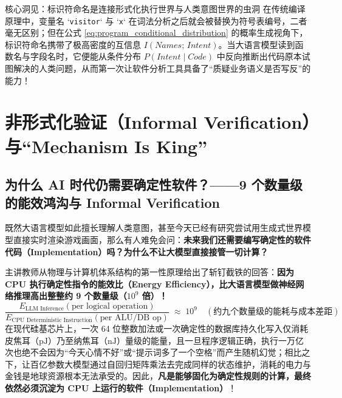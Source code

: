 \documentclass[a4paper]{article}
\begin{document}
\begin{knowledgebox}{核心洞见：标识符命名是连接形式化执行世界与人类意图世界的虫洞}
在传统编译原理中，变量名 `\texttt{visitor}` 与 `\texttt{x}` 在词法分析之后就会被替换为符号表编号，二者毫无区别；但在公式 \eqref{eq:program_conditional_distribution} 的概率生成视角下，标识符命名携带了极高密度的互信息 $I(\mathit{Names};\, \mathit{Intent})$。当大语言模型读到函数名与字段名时，它便能从条件分布 $P(\mathit{Intent} \mid \mathit{Code})$ 中反向推断出代码原本试图解决的人类问题，从而第一次让软件分析工具具备了“质疑业务语义是否写反”的能力！
\end{knowledgebox}

\section{非形式化验证（Informal Verification）与“Mechanism Is King”}

\subsection{为什么 AI 时代仍需要确定性软件？——9 个数量级的能效鸿沟与 Informal Verification}

既然大语言模型如此擅长理解人类意图，甚至今天已经有研究尝试用生成式世界模型直接实时渲染游戏画面，那么有人难免会问：\textbf{未来我们还需要编写确定性的软件代码（Implementation）吗？为什么不让大模型直接接管一切计算？}

主讲教师从物理与计算机体系结构的第一性原理给出了斩钉截铁的回答：\textbf{因为 CPU 执行确定性指令的能效比（Energy Efficiency），比大语言模型做神经网络推理高出整整约 9 个数量级（$10^9$ 倍）！}
\begin{equation}
\frac{E_{\text{LLM Inference}}(\text{per logical operation})}{E_{\text{CPU Deterministic Instruction}}(\text{per ALU/DB op})} \;\approx\; 10^9 \quad (\text{约九个数量级的能耗与成本差距})
\label{eq:cpu_vs_llm_energy_gap}
\end{equation}
在现代硅基芯片上，一次 64 位整数加法或一次确定性的数据库持久化写入仅消耗皮焦耳（$\mathrm{pJ}$）乃至纳焦耳（$\mathrm{nJ}$）量级的能量，且一旦程序逻辑正确，执行一万亿次也绝不会因为“今天心情不好”或“提示词多了一个空格”而产生随机幻觉；相比之下，让百亿参数大模型通过自回归矩阵乘法去完成同样的状态维护，消耗的电力与金钱是地球资源根本无法承受的。因此，\textbf{凡是能够固化为确定性规则的计算，最终依然必须沉淀为 CPU 上运行的软件（Implementation）}！
\end{document}
